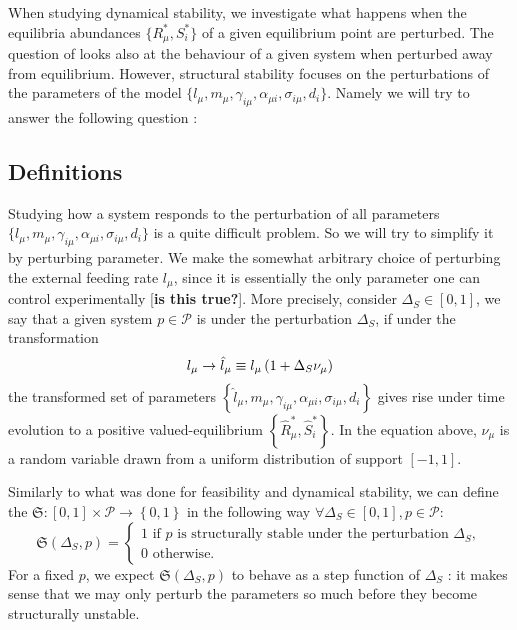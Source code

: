\documentclass[12pt, titlepage]{report}
\begin{document}
When studying dynamical stability, we investigate what happens when the equilibria abundances $\{R^*_\mu, S^*_i\}$ of a given equilibrium point are perturbed. The question of  looks also at the behaviour of a given system when perturbed away from equilibrium. However, structural stability focuses on the perturbations of the parameters of the model \ie  $\{l_\mu, m_\mu, \gamma_{i\mu}, \alpha_{\mu i}, \sigma_{i\mu},d_i\}$. Namely we will try to answer the following question :

\begin{centering}
\end{centering}

\subsection{Definitions}
Studying how a system responds to the perturbation of all parameters $\{l_\mu, m_\mu, \gamma_{i\mu}, \alpha_{\mu i}, \sigma_{i\mu},d_i\}$ is a quite difficult problem. So we will try to simplify it by perturbing  parameter. We make the somewhat arbitrary choice of perturbing the external feeding rate $l_\mu$, since it is essentially the only parameter one can control experimentally [\textbf{is this true?}]. More precisely, consider $\Delta_S \in [0,1]$, we say that a given system $p \in \mathcal{P}$ is  under the perturbation $\Delta_S$, if under the transformation
\begin{equation}
l_\mu \rightarrow \hat{l}_\mu \equiv l_\mu\left( 1+\Delta_S \nu_\mu \right)
\end{equation}
the transformed set of parameters $\left\{ \hat{l}_\mu, m_\mu, \gamma_{i\mu}, \alpha_{\mu i}, \sigma_{i\mu},d_i \right\}$ gives rise under time evolution to a positive valued-equilibrium $\left\{\hat{R}^*_\mu, \hat{S}^*_i\right\}$. In the equation above, $\nu_\mu$ is a random variable drawn from a uniform distribution of support $[-1, 1]$.

Similarly to what was done for feasibility and dynamical stability, we can define the  $\mathfrak{S} : [0,1] \times \mathcal{P} \rightarrow \left\{0,1\right\}$ in the following way $\forall \Delta_S \in [0,1], p \in \mathcal{P}$:
\begin{equation}
\mathfrak{S}(\Delta_S, p)=
\begin{cases}
1 \text{ if }p \text{ is structurally stable under the perturbation }\Delta_S, \\
0 \text{ otherwise.}
\end{cases}
\end{equation}
For a fixed $p$, we expect $\mathfrak{S}(\Delta_S, p)$ to behave as a step function of $\Delta_S$ : it makes sense that we may only perturb the parameters so much before they become structurally unstable.
\end{document}
